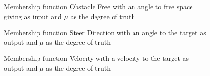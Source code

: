 \documentclass[../Head/Main.tex]{subfiles}
\begin{document}
\begin{figure}[H]
	\centering
	
	\caption{Membership function Obstacle Free with an angle to free space giving as input and  $\mu$ as the degree of truth}
	\label{fig:MSF_Obstacle_free}
\end{figure}

\begin{figure}[H]
	\centering
	
	\caption{Membership function Steer Direction with an angle to the target as output and $\mu$ as the degree of truth}
	\label{fig:MSF_Steer_direction}
\end{figure}

\begin{figure}[H]
	\centering
	
	\caption{Membership function Velocity with a velocity to the target as output and $\mu$ as the degree of truth}
	\label{fig:MSF_Velocity}
\end{figure}
\end{document}
